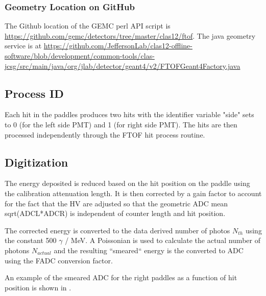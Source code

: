 \subsubsection{Geometry Location on GitHub}
The Github location of the GEMC perl API script is \url{https://github.com/gemc/detectors/tree/master/clas12/ftof}.
The java geometry service is at \url{https://github.com/JeffersonLab/clas12-offline-software/blob/development/common-tools/clas-jcsg/src/main/java/org/jlab/detector/geant4/v2/FTOFGeant4Factory.java}

\subsection{Process ID}

Each hit in the paddles produces two hits with the identifier variable "side" sets to 0 (for the left side PMT) and 1 (for right side PMT).
The hits are then processed independently through the FTOF hit process routine.

\subsection{Digitization}

The energy deposited is reduced based on the hit position on the paddle using the calibration attenuation length. It is then corrected by a gain factor
to account for the fact that the HV are adjusted so that the geometric ADC mean sqrt(ADCL*ADCR) is independent of counter length and hit position.

The corrected energy is converted to the data derived number of photos $N_{th}$ using the constant 500 $\gamma$ / MeV. A Poissonian is used to
calculate the actual number of photons $N_{actual}$ and the resulting ``smeared`` energy is the converted to ADC using the FADC conversion factor.

An example of the smeared ADC for the right paddles as a function of hit position is shown in .

